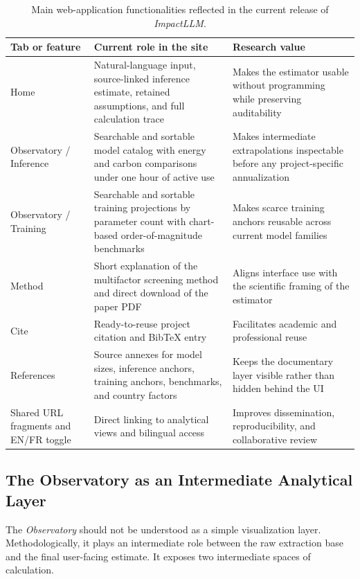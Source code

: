\documentclass[11pt,a4paper]{article}
\begin{document}
\begin{table}[htbp]
\centering
\small
\begin{tabularx}{\textwidth}{|L{2.4cm}|Y|Y|}
\hline
Tab or feature & Current role in the site & Research value \\
\hline
Home & Natural-language input, source-linked inference estimate, retained assumptions, and full calculation trace & Makes the estimator usable without programming while preserving auditability \\
\hline
Observatory / Inference & Searchable and sortable model catalog with energy and carbon comparisons under one hour of active use & Makes intermediate extrapolations inspectable before any project-specific annualization \\
\hline
Observatory / Training & Searchable and sortable training projections by parameter count with chart-based order-of-magnitude benchmarks & Makes scarce training anchors reusable across current model families \\
\hline
Method & Short explanation of the multifactor screening method and direct download of the paper PDF & Aligns interface use with the scientific framing of the estimator \\
\hline
Cite & Ready-to-reuse project citation and BibTeX entry & Facilitates academic and professional reuse \\
\hline
References & Source annexes for model sizes, inference anchors, training anchors, benchmarks, and country factors & Keeps the documentary layer visible rather than hidden behind the UI \\
\hline
Shared URL fragments and EN/FR toggle & Direct linking to analytical views and bilingual access & Improves dissemination, reproducibility, and collaborative review \\
\hline
\end{tabularx}
\caption{Main web-application functionalities reflected in the current release of \emph{ImpactLLM}.}
\label{tab:web-features}
\end{table}

\subsection{The Observatory as an Intermediate Analytical Layer}
The \emph{Observatory} should not be understood as a simple visualization layer. Methodologically, it plays an intermediate role between the raw extraction base and the final user-facing estimate. It exposes two intermediate spaces of calculation.
\end{document}
